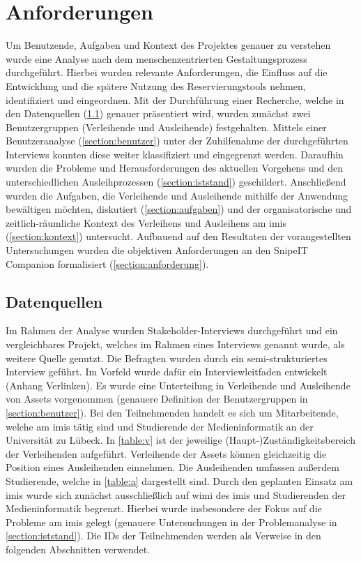 
\chapter{Anforderungen}
\label{chapter-analyse}

Um Benutzende, Aufgaben und Kontext des Projektes genauer zu verstehen wurde
eine Analyse nach dem menschenzentrierten Gestaltungsprozess durchgeführt.
Hierbei wurden relevante Anforderungen, die Einfluss auf die Entwicklung und die
spätere Nutzung des Reservierungstools nehmen, identifiziert und eingeordnen.
Mit der Durchführung einer Recherche, welche in den Datenquellen
(\ref{section:daten}) genauer präsentiert wird, wurden zunächst zwei
Benutzergruppen (Verleihende und Ausleihende) festgehalten. Mittels einer
Benutzeranalyse (\ref{section:benutzer}) unter der Zuhilfenahme der
durchgeführten Interviews konnten diese weiter klassifiziert und eingegrenzt
werden. Daraufhin wurden die Probleme und Herausforderungen des aktuellen
Vorgehens und den unterschiedlichen Ausleihprozessen (\ref{section:iststand})
geschildert. Anschließend wurden die Aufgaben, die Verleihende und Ausleihende
mithilfe der Anwendung bewältigen möchten, diskutiert (\ref{section:aufgaben})
und der organisatorische und zeitlich-räumliche Kontext des Verleihens und
Ausleihens am \ac{imis} (\ref{section:kontext}) untersucht. Aufbauend auf den
Resultaten der vorangestellten Untersuchungen wurden die objektiven
Anforderungen an den SnipeIT Companion formalisiert (\ref{section:anforderung}).

\section{Datenquellen}
\label{section:daten}
Im Rahmen der Analyse wurden Stakeholder-Interviews durchgeführt und ein
vergleichbares Projekt, welches im Rahmen eines Interviews genannt wurde, als
weitere Quelle genutzt. Die Befragten wurden durch ein semi-strukturiertes
Interview geführt. Im Vorfeld wurde dafür ein Interviewleitfaden entwickelt
(Anhang Verlinken). Es wurde eine Unterteilung in Verleihende und Ausleihende
von Assets vorgenommen (genauere Definition der Benutzergruppen in
\ref{section:benutzer}). Bei den Teilnehmenden handelt es sich um Mitarbeitende,
welche am \ac{imis} tätig sind und Studierende der Medieninformatik an der
Universität zu Lübeck. In \ref{table:v} ist der jeweilige
(Haupt-)Zuständigkeitsbereich der Verleihenden aufgeführt. Verleihende der
Assets können gleichzeitig die Position eines Ausleihenden einnehmen. Die
Ausleihenden umfassen außerdem Studierende, welche in \ref{table:a} dargestellt
sind. Durch den geplanten Einsatz am \ac{imis} wurde sich zunächst
ausschließlich auf \ac{wimi} des \ac{imis} und Studierenden der Medieninformatik
begrenzt. Hierbei wurde insbesondere der Fokus auf die Probleme am \ac*{imis}
gelegt (genauere Untersuchungen in der Problemanalyse in
\ref{section:iststand}). Die IDs der Teilnehmenden werden als Verweise in den
folgenden Abschnitten verwendet.

